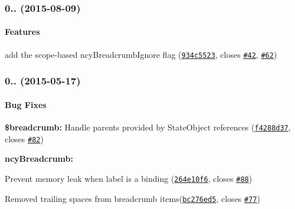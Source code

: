 \label{_0.4.1}%
 \subsubsection*{0.. (2015-\/08-\/09)}

\paragraph*{Features}


\begin{DoxyItemize}
\item add the scope-\/based ncy\+Breadcrumb\+Ignore flag (\href{http://github.com/ncuillery/angular-breadcrumb/commit/934c5523208a9615d7cfa3abcb397bbe131332ac}{\tt 934c5523}, closes \href{http://github.com/ncuillery/angular-breadcrumb/issues/42}{\tt \#42}, \href{http://github.com/ncuillery/angular-breadcrumb/issues/42}{\tt \#62})
\end{DoxyItemize}

\label{_0.4.0}%
 \subsubsection*{0.. (2015-\/05-\/17)}

\paragraph*{Bug Fixes}


\begin{DoxyItemize}
\item {\bfseries \$breadcrumb\+:} Handle parents provided by State\+Object references (\href{http://github.com/ncuillery/angular-breadcrumb/commit/f4288d375fd1090ffec1d67e85c6300d74d86d37}{\tt f4288d37}, closes \href{http://github.com/ncuillery/angular-breadcrumb/issues/82}{\tt \#82})
\item {\bfseries ncy\+Breadcrumb\+:}
\begin{DoxyItemize}
\item Prevent memory leak when label is a binding (\href{http://github.com/ncuillery/angular-breadcrumb/commit/264e10f680e1bbb8d1e00cf500de39cac4222cfd}{\tt 264e10f6}, closes \href{http://github.com/ncuillery/angular-breadcrumb/issues/88}{\tt \#88})
\item Removed trailing spaces from breadcrumb items(\href{http://github.com/ncuillery/angular-breadcrumb/commit/bc276ed5351a586d4a6dc83ada0687e6ca485344}{\tt bc276ed5}, closes \href{http://github.com/ncuillery/angular-breadcrumb/issues/77}{\tt \#77})
\end{DoxyItemize}
\end{DoxyItemize}

